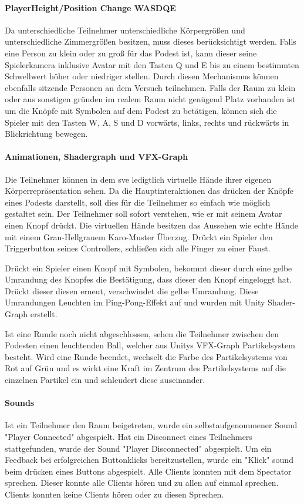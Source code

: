 \documentclass[a4paper,11pt]{article}%
\renewcommand{\\}{\vspace*{0.5\baselineskip} \newline}
\begin{document}
\paragraph{PlayerHeight/Position Change WASDQE}
Da unterschiedliche Teilnehmer unterschiedliche Körpergrößen und unterschiedliche Zimmergrößen besitzen, muss dieses berücksichtigt werden. 
Falls eine Person zu klein oder zu groß für das Podest ist, kann dieser seine Spielerkamera inklusive Avatar mit den Tasten Q und E bis zu einem bestimmten Schwellwert höher oder niedriger stellen. Durch diesen Mechanismus können ebenfalls sitzende Personen an dem Versuch teilnehmen.
Falls der Raum zu klein oder aus sonstigen gründen im realem Raum nicht genügend Platz vorhanden ist um die Knöpfe mit Symbolen auf dem Podest zu betätigen, können sich die Spieler mit den Tasten W, A, S und D vorwärts, links, rechts und rückwärts in Blickrichtung bewegen.

\paragraph{Animationen, Shadergraph und VFX-Graph}
Die Teilnehmer können in dem \ac{sve} ledigtlich virtuelle Hände ihrer eigenen Körperrepräsentation sehen. Da die Hauptinteraktionen das drücken der Knöpfe eines Podests darstellt, soll dies für die Teilnehmer so einfach wie möglich gestaltet sein. Der Teilnehmer soll sofort verstehen, wie er mit seinem Avatar einen Knopf drückt. Die virtuellen Hände besitzen das Aussehen wie echte Hände mit einem Grau-Hellgrauem Karo-Muster Überzug. Drückt ein Spieler den Triggerbutton seines Controllers, schließen sich alle Finger zu einer Faust.

Drückt ein Spieler einen Knopf mit Symbolen, bekommt dieser durch eine gelbe Umrandung des Knopfes die Bestätigung, dass dieser den Knopf eingeloggt hat. Drückt dieser diesen erneut, verschwindet die gelbe Umrandung. Diese Umrandungen Leuchten im Ping-Pong-Effekt auf und wurden mit Unity Shader-Graph erstellt.

Ist eine Runde noch nicht abgeschlossen, sehen die Teilnehmer zwischen den Podesten einen leuchtenden Ball, welcher aus Unitys VFX-Graph Partikelsystem besteht. Wird eine Runde beendet, wechselt die Farbe des Partikelsystems von Rot auf Grün und es wirkt eine Kraft im Zentrum des Partikelsystems auf die einzelnen Partikel ein und schleudert diese auseinander.

\paragraph{Sounds}
Ist ein Teilnehmer den Raum beigetreten, wurde ein selbstaufgenommener Sound "Player Connected" abgespielt. Hat ein Disconnect eines Teilnehmers stattgefunden, wurde der Sound "Player Disconnected" abgespielt.
Um ein Feedback bei erfolgreichen Buttonklicks bereitzustellen, wurde ein "Klick" sound beim drücken eines Buttons abgespielt.
Alle Clients konnten mit dem Spectator sprechen. Dieser konnte alle Clients hören und zu allen auf einmal sprechen. Clients konnten keine Clients hören oder zu diesen Sprechen.
\end{document}
